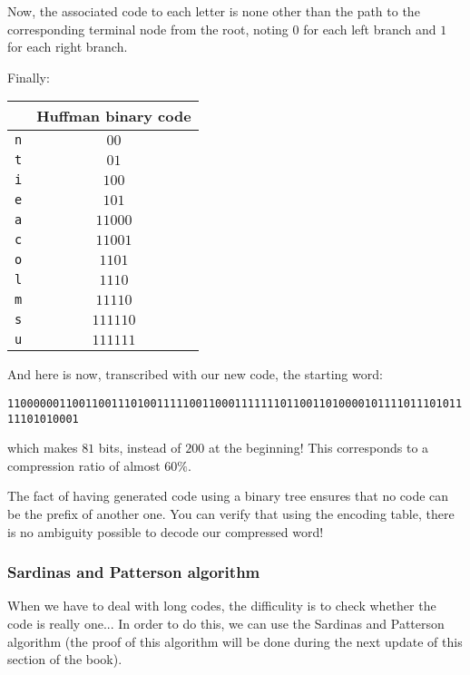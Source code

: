 	Now, the associated code to each letter is none other than the path to the corresponding terminal node from the root, noting $0$ for each left branch and $1$ for each right branch.

	Finally:
	\begin{table}[H]
		\centering
		\begin{tabular}{|c|c|}
		\hline
		\rowcolor[HTML]{9B9B9B} 
		\multicolumn{1}{|l|}{\cellcolor[HTML]{9B9B9B}\textbf{Letter}} & \multicolumn{1}{l|}{\cellcolor[HTML]{9B9B9B}\textbf{Huffman binary code}} \\ \hline
		\texttt{n} & $00$ \\ \hline
		\texttt{t} & $01$ \\ \hline
		\texttt{i} & $100$ \\ \hline
		\texttt{e} & $101$ \\ \hline
		\texttt{a} & $11000$ \\ \hline
		\texttt{c} & $11001$ \\ \hline
		\texttt{o} & $1101$ \\ \hline
		\texttt{l} & $1110$ \\ \hline
		\texttt{m} & $11110$ \\ \hline
		\texttt{s} & $111110$ \\ \hline
		\texttt{u} & $111111$ \\ \hline
		\end{tabular}
	\end{table}
	And here is now, transcribed with our new code, the starting word:
	\begin{center}
	{\small \texttt{110000001100110011101001111100110001111111011001101000010111101110101111101010001}}
	\end{center}
	which makes $81$ bits, instead of $200$ at the beginning! This corresponds to a compression ratio of almost $60\%$.
	
	The fact of having generated code using a binary tree ensures that no code can be the prefix of another one. You can verify that using the encoding table, there is no ambiguity possible to decode our compressed word!
	
	\subsubsection{Sardinas and Patterson algorithm}
	When we have to deal with long codes, the difficulity is to check whether the code is really one... In order to do this, we can use the Sardinas and Patterson algorithm (the proof of this algorithm will be done during the next update of this section of the book).

